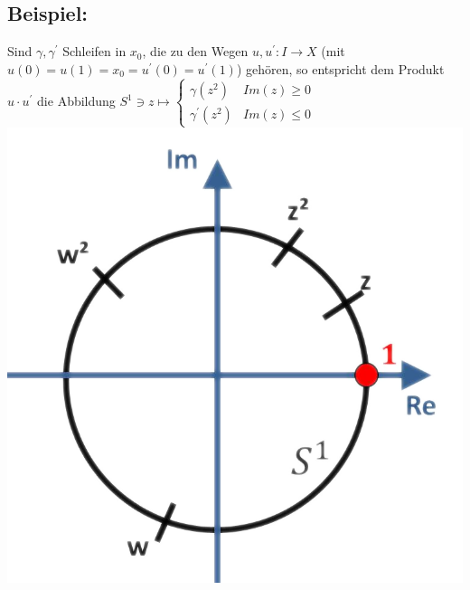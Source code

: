 \documentclass[a4paper,11pt,notitlepage]{report}
\theoremstyle{definition}
\newenvironment{bsp}[1]
{
\setlength{\fboxsep}{10pt}
\subsection*{Beispiel: #1}
\begin{upshape}
}
{
\end{upshape}
}
\begin{document}
\begin{bsp}{}
	Sind $\gamma, \gamma^\prime$ Schleifen in $x_0$, die zu den Wegen $u,u^\prime \colon I \rightarrow X$ (mit $u(0)=u(1)=x_0=u^\prime(0)=u^\prime(1)$) gehören, so entspricht dem Produkt $u \cdot u^\prime$ die Abbildung $S^1 \ni z \mapsto \begin{cases} \gamma(z^2) & Im(z) \geq 0 \\ \gamma^\prime(z^2) & Im(z) \leq 0 \end{cases}$ \newline
	\newline \includegraphics[scale=0.4]{images/Produkt_auf_S1.png}
\end{bsp}
\end{document}
